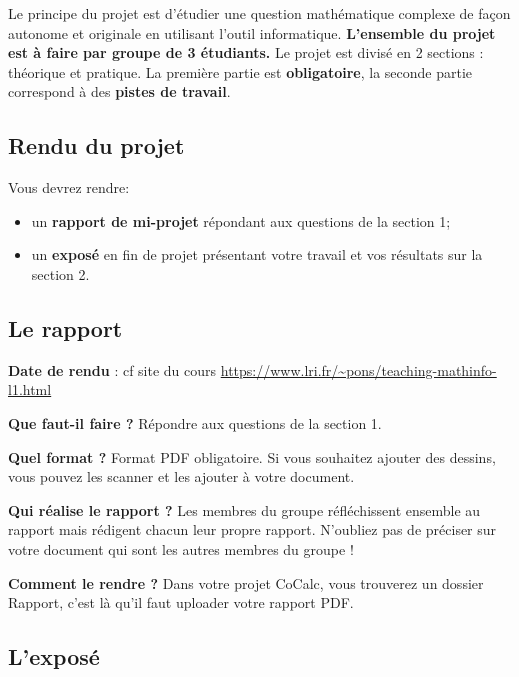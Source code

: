 Le principe du projet est d'étudier une question mathématique complexe de façon autonome et originale en utilisant l'outil informatique. \textbf{L'ensemble du projet est à faire par groupe de 3 étudiants.} Le projet est divisé en 2 sections : théorique et pratique. La première partie est \textbf{obligatoire}, la seconde partie correspond à des \textbf{pistes de travail}.

\subsection*{Rendu du projet}\strut

Vous devrez rendre:

\begin{itemize}

\item un \textbf{rapport de mi-projet} répondant aux questions de la section 1;

\item un \textbf{exposé} en fin de projet présentant votre travail et vos résultats sur la section 2.
\end{itemize}

\subsection*{Le rapport}\strut

\smallskip
\textbf{Date de rendu} : cf site du cours \url{https://www.lri.fr/~pons/teaching-mathinfo-l1.html}

\smallskip
\textbf{Que faut-il faire ?} Répondre aux questions de la section 1.

\smallskip
\textbf{Quel format ?} Format PDF obligatoire. Si vous souhaitez ajouter des dessins, vous pouvez les scanner et les ajouter à votre document.

\smallskip
\textbf{Qui réalise le rapport ?} Les membres du groupe réfléchissent ensemble au rapport mais rédigent chacun leur propre rapport. N'oubliez pas de préciser sur votre document qui sont les autres membres du groupe !

\smallskip
\textbf{Comment le rendre ?} Dans votre projet CoCalc, vous trouverez un dossier \og Rapport\fg, c'est là qu'il faut uploader votre rapport PDF.

\subsection*{L'exposé}\strut

